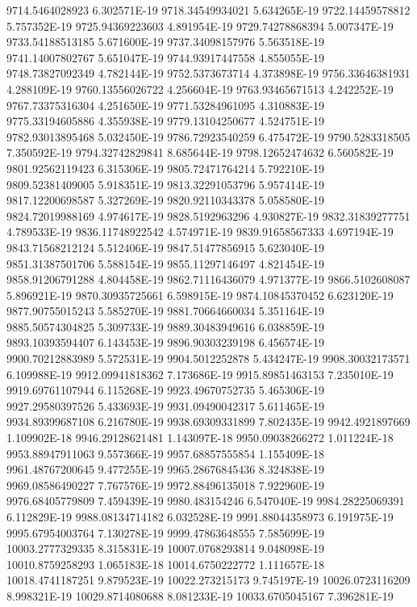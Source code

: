 9714.5464028923  6.302571E-19
9718.34549934021  5.634265E-19
9722.14459578812  5.757352E-19
9725.94369223603  4.891954E-19
9729.74278868394  5.007347E-19
9733.54188513185  5.671600E-19
9737.34098157976  5.563518E-19
9741.14007802767  5.651047E-19
9744.93917447558  4.855055E-19
9748.73827092349  4.782144E-19
9752.5373673714  4.373898E-19
9756.33646381931  4.288109E-19
9760.13556026722  4.256604E-19
9763.93465671513  4.242252E-19
9767.73375316304  4.251650E-19
9771.53284961095  4.310883E-19
9775.33194605886  4.355938E-19
9779.13104250677  4.524751E-19
9782.93013895468  5.032450E-19
9786.72923540259  6.475472E-19
9790.5283318505  7.350592E-19
9794.32742829841  8.685644E-19
9798.12652474632  6.560582E-19
9801.92562119423  6.315306E-19
9805.72471764214  5.792210E-19
9809.52381409005  5.918351E-19
9813.32291053796  5.957414E-19
9817.12200698587  5.327269E-19
9820.92110343378  5.058580E-19
9824.72019988169  4.974617E-19
9828.5192963296  4.930827E-19
9832.31839277751  4.789533E-19
9836.11748922542  4.574971E-19
9839.91658567333  4.697194E-19
9843.71568212124  5.512406E-19
9847.51477856915  5.623040E-19
9851.31387501706  5.588154E-19
9855.11297146497  4.821454E-19
9858.91206791288  4.804458E-19
9862.71116436079  4.971377E-19
9866.5102608087  5.896921E-19
9870.30935725661  6.598915E-19
9874.10845370452  6.623120E-19
9877.90755015243  5.585270E-19
9881.70664660034  5.351164E-19
9885.50574304825  5.309733E-19
9889.30483949616  6.038859E-19
9893.10393594407  6.143453E-19
9896.90303239198  6.456574E-19
9900.70212883989  5.572531E-19
9904.5012252878  5.434247E-19
9908.30032173571  6.109988E-19
9912.09941818362  7.173686E-19
9915.89851463153  7.235010E-19
9919.69761107944  6.115268E-19
9923.49670752735  5.465306E-19
9927.29580397526  5.433693E-19
9931.09490042317  5.611465E-19
9934.89399687108  6.216780E-19
9938.69309331899  7.802435E-19
9942.4921897669  1.109902E-18
9946.29128621481  1.143097E-18
9950.09038266272  1.011224E-18
9953.88947911063  9.557366E-19
9957.68857555854  1.155409E-18
9961.48767200645  9.477255E-19
9965.28676845436  8.324838E-19
9969.08586490227  7.767576E-19
9972.88496135018  7.922960E-19
9976.68405779809  7.459439E-19
9980.483154246  6.547040E-19
9984.28225069391  6.112829E-19
9988.08134714182  6.032528E-19
9991.88044358973  6.191975E-19
9995.67954003764  7.130278E-19
9999.47863648555  7.585699E-19
10003.2777329335  8.315831E-19
10007.0768293814  9.048098E-19
10010.8759258293  1.065183E-18
10014.6750222772  1.111657E-18
10018.4741187251  9.879523E-19
10022.273215173  9.745197E-19
10026.0723116209  8.998321E-19
10029.8714080688  8.081233E-19
10033.6705045167  7.396281E-19
